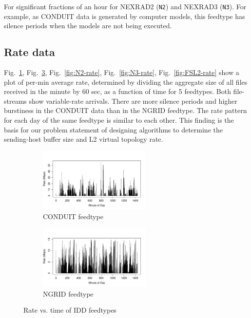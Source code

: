 For significant fractions of an hour
for NEXRAD2 (\texttt{N2}) and NEXRAD3 (\texttt{N3}). For example, as
CONDUIT data is generated by computer models,
this feedtype has silence periods when the models are not being executed.


\subsection{Rate data}
\label{sec:rate-results}
Fig.~\ref{fig:C-rate}, Fig.~\ref{fig:NG-rate}, Fig.~\ref{fig:N2-rate}, Fig.~\ref{fig:N3-rate}, Fig.~\ref{fig:FSL2-rate}  show a plot of per-min average rate, determined
by dividing the aggregate size of all files received in the minute by 60 sec,
as a function of time for 5 feedtypes. Both file-streams
show variable-rate arrivals. There are more silence periods and higher burstiness in the CONDUIT data than in the NGRID feedtype. 
The rate pattern for each day of the same feedtype is similar to each other. This finding is the basis for our problem statement of designing algorithms to determine the sending-host buffer size
and L2 virtual topology rate.

\begin{figure}
\centering
    \begin{subfigure}{0.5\linewidth}
        \centering
        \includegraphics[width=2.2in]{figures/rate_time_CONDUIT0602.pdf}
        \caption{CONDUIT feedtype}
        \label{fig:C-rate}
    \end{subfigure}\hfill
    \begin{subfigure}{0.5\linewidth}
	\centering
    \includegraphics[width=2.2in]{figures/rate_time_NGRID0602.pdf}
        \caption{NGRID feedtype}
        \label{CONDUIT_Inter_75}
    \end{subfigure}\hfill
    \caption{Rate vs. time of IDD feedtypes}
    \label{fig:NG-rate}
\end{figure}








